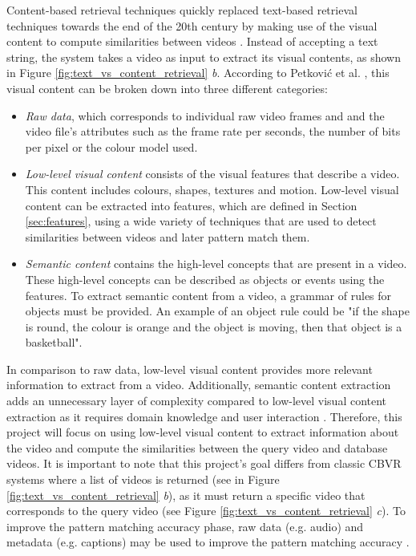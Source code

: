 \documentclass[11pt,openany,a4paper]{article}
\begin{document}
Content-based retrieval techniques quickly replaced text-based retrieval techniques towards the end of the 20th century by making use of the visual content to compute similarities between videos \cite{lai2015trajectory}. Instead of accepting a text string, the system takes a video as input to extract its visual contents, as shown in Figure \ref{fig:text_vs_content_retrieval} \emph{b}. According to Petković et al. \cite{petkovic2000}, this visual content can be broken down into three different categories:
\begin{itemize}
    \item \textit{Raw data}, which corresponds to individual raw video frames and and the video file's attributes such as the frame rate per seconds, the number of bits per pixel or the colour model used.
    \item \textit{Low-level visual content}  consists of the visual features that describe a video. This content includes colours, shapes, textures and motion. Low-level visual content can be extracted into features, which are defined in Section \ref{sec:features}, using a wide variety of techniques that are used to detect similarities between videos \cite{lai2015trajectory} and later pattern match them.
    \item \textit{Semantic content} contains the high-level concepts that are present in a video. These high-level concepts can be described as objects or events using the features. To extract semantic content from a video, a grammar of rules for objects must be provided. An example of an object rule could be "if the shape is round, the colour is orange and the object is moving, then that object is a basketball".
\end{itemize}

In comparison to raw data, low-level visual content provides more relevant information to extract from a video. Additionally, semantic content extraction adds an unnecessary layer of complexity compared to low-level visual content extraction as it requires domain knowledge and user interaction \cite{petkovic2000}. Therefore, this project will focus on using low-level visual content to extract information about the video and compute the similarities between the query video and database videos. It is important to note that this project's goal differs from classic CBVR systems where a list of videos is returned (see in Figure \ref{fig:text_vs_content_retrieval} \emph{b}), as it must return a specific video that corresponds to the query video (see Figure \ref{fig:text_vs_content_retrieval} \emph{c}). To improve the pattern matching accuracy phase, raw data (e.g. audio) and metadata (e.g. captions) may be used to improve the pattern matching accuracy \cite{patel2012}.\\
\end{document}
